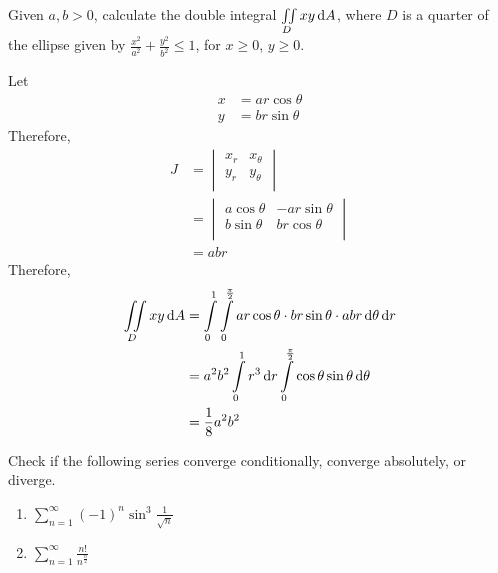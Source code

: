 \documentclass[fleqn, a4paper, 12pt, twoside]{article}
\theoremstyle{definition}
\theoremstyle{theorem}
\begin{document}
\begin{question}
	Given $a,b > 0$, calculate the double integral $\iint\limits_{D} x y \dif A$, where $D$ is a quarter of the ellipse given by $\frac{x^2}{a^2} + \frac{y^2}{b^2} \le 1$, for $x \ge 0$, $y \ge 0$.
\end{question}

\begin{solution}
	Let
	\begin{align*}
		x & = a r \cos \theta \\
		y & = b r \sin \theta
	\end{align*}
	Therefore,
	\begin{align*}
		J &=
			\begin{vmatrix}
				x_r & x_{\theta} \\
				y_r & y_{\theta} \\
			\end{vmatrix}\\
		  &=
			\begin{vmatrix}
				a \cos \theta & -a r \sin \theta \\
				b \sin \theta & b r \cos \theta  \\
			\end{vmatrix}\\
		  &= a b r
	\end{align*}
	Therefore,
	\begin{align*}
		\iint\limits_{D} x y \dif A & = \int\limits_{0}^{1} \int\limits_{0}^{\frac{\pi}{2}} a r \cos \theta \cdot b r \sin \theta \cdot a b r \dif \theta \dif r \\
                                            & = a^2 b^2 \int\limits_{0}^{1} r^3 \dif r \int\limits_{0}^{\frac{\pi}{2}} \cos \theta \sin \theta \dif \theta               \\
                                            & = \frac{1}{8} a^2 b^2
	\end{align*}
\end{solution}

\begin{question}
	Check if the following series converge conditionally, converge absolutely, or diverge.
	\begin{enumerate}
		\item $\displaystyle \sum\limits_{n = 1}^{\infty} (-1)^n \sin^3 \frac{1}{\sqrt{n}}$
		\item $\displaystyle \sum\limits_{n = 1}^{\infty} \frac{n!}{n^{\frac{n}{2}}}$
	\end{enumerate}
\end{question}
\end{document}
